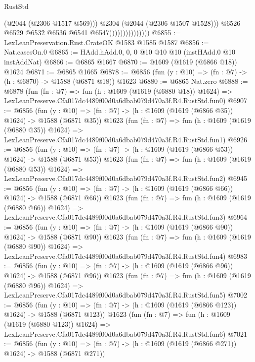 \begin{lexlean}{RustStd}
\begin{coremodule}
                                      (@2044 (@2306 @1517 @569)))
                                    @2304
                                    (@2044 (@2306 @1507 @1528)))
                                  @6526
                                  @6529
                                  @6532
                                  @6536
                                  @6541
                                  @6547)))))))))))))))
@6855 := LexLeanPreservation.Rust.CrateOK @1583 @1585 @1587
@6856 := Nat.casesOn.{0}
@6865 := HAdd.hAdd.{0, 0, 0} @10 @10 @10 (instHAdd.{0} @10 instAddNat)
@6866 := @6865 @1667
@6870 := @1609 (@1619 (@6866 @18)) @1624
@6871 := @6865 @1665
@6878 := @6856 (fun (y : @10) => (fn : @7) -> (h : @6870) -> @1588 (@6871 @18)) @1623
@6880 := @6865 Nat.zero
@6888 := @6878
    (fun (fn : @7) =>
    fun (h : @1609 (@1619 (@6880 @18)) @1624) =>
    LexLeanPreserve.Cfa017dc4489f00d0a6dbab079d470a3f.R4.RustStd.fun0)
@6907 := @6856
    (fun (y : @10) => (fn : @7) -> (h : @1609 (@1619 (@6866 @35)) @1624) -> @1588 (@6871 @35))
    @1623
    (fun (fn : @7) =>
    fun (h : @1609 (@1619 (@6880 @35)) @1624) =>
    LexLeanPreserve.Cfa017dc4489f00d0a6dbab079d470a3f.R4.RustStd.fun1)
@6926 := @6856
    (fun (y : @10) => (fn : @7) -> (h : @1609 (@1619 (@6866 @53)) @1624) -> @1588 (@6871 @53))
    @1623
    (fun (fn : @7) =>
    fun (h : @1609 (@1619 (@6880 @53)) @1624) =>
    LexLeanPreserve.Cfa017dc4489f00d0a6dbab079d470a3f.R4.RustStd.fun2)
@6945 := @6856
    (fun (y : @10) => (fn : @7) -> (h : @1609 (@1619 (@6866 @66)) @1624) -> @1588 (@6871 @66))
    @1623
    (fun (fn : @7) =>
    fun (h : @1609 (@1619 (@6880 @66)) @1624) =>
    LexLeanPreserve.Cfa017dc4489f00d0a6dbab079d470a3f.R4.RustStd.fun3)
@6964 := @6856
    (fun (y : @10) => (fn : @7) -> (h : @1609 (@1619 (@6866 @90)) @1624) -> @1588 (@6871 @90))
    @1623
    (fun (fn : @7) =>
    fun (h : @1609 (@1619 (@6880 @90)) @1624) =>
    LexLeanPreserve.Cfa017dc4489f00d0a6dbab079d470a3f.R4.RustStd.fun4)
@6983 := @6856
    (fun (y : @10) => (fn : @7) -> (h : @1609 (@1619 (@6866 @96)) @1624) -> @1588 (@6871 @96))
    @1623
    (fun (fn : @7) =>
    fun (h : @1609 (@1619 (@6880 @96)) @1624) =>
    LexLeanPreserve.Cfa017dc4489f00d0a6dbab079d470a3f.R4.RustStd.fun5)
@7002 := @6856
    (fun (y : @10) => (fn : @7) -> (h : @1609 (@1619 (@6866 @123)) @1624) -> @1588 (@6871 @123))
    @1623
    (fun (fn : @7) =>
    fun (h : @1609 (@1619 (@6880 @123)) @1624) =>
    LexLeanPreserve.Cfa017dc4489f00d0a6dbab079d470a3f.R4.RustStd.fun6)
@7021 := @6856
    (fun (y : @10) => (fn : @7) -> (h : @1609 (@1619 (@6866 @271)) @1624) -> @1588 (@6871 @271))

\end{coremodule}
\end{lexlean}
